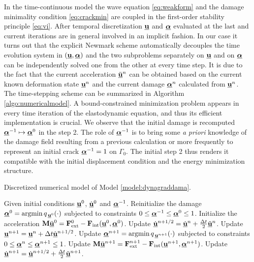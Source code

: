 In the time-continuous model the wave equation \eqref{eq:weakform} and the damage minimality condition \eqref{eq:crackmin} are coupled in the first-order stability principle \eqref{eq:vi}. After temporal discretization $\uvec$ and $\dvec$ evaluated at the last and current iterations are in general involved in an implicit fashion. In our case it turns out that the explicit Newmark scheme automatically decouples the time evolution system in $(\uvec,\dvec)$ and the two subproblems separately on $\uvec$ and on $\dvec$ can be independently solved one from the other at every time step. It is due to the fact that the current acceleration $\ddot{\uvec}^n$ can be obtained based on the current known deformation state $\uvec^n$ and the current damage $\dvec^n$ calculated from $\uvec^n$. The time-stepping scheme can be summarized in Algorithm \ref{algo:numericalmodel}. A bound-constrained minimization problem appears in every time iteration of the elastodynamic equation, and thus its efficient implementation is crucial. We observe that the initial damage is recomputed $\dvec^{-1}\mapsto\dvec^0$ in the step 2. The role of $\dvec^{-1}$ is to bring some \emph{a priori} knowledge of the damage field resulting from a previous calculation or more frequently to represent an initial crack $\dvec^{-1}=1$ on $\Gamma_0$. The initial step 2 thus renders it compatible with the initial displacement condition and the energy minimization structure.
\begin{algorithm*}[htbp]
\caption{Discretized numerical model of Model \ref{model:dynagraddama}.} \label{algo:numericalmodel}
\begin{algorithmic}[1]\linespread{1.2}\selectfont\normalsize
\State Given initial conditions $\uvec^0$, $\dot{\uvec}^0$ and $\dvec^{-1}$.
\State Reinitialize the damage $\dvec^0=\operatorname{arg min}q_{\,\uvec^0}(\cdot)$ subjected to constraints $0\leq\dvec^{-1}\leq\dvec^0\leq 1$.
\State Initialize the acceleration $\vec{M}\ddot{\uvec}^0=\vec{F}_\mathrm{ext}^0-\vec{F}_\mathrm{int}(\uvec^0,\dvec^0)$.
  \State Update $\dot{\uvec}^{n+1/2}=\dot{\uvec}^{n}+\frac{\Delta t}{2}\ddot{\uvec}^n$.
  \State Update $\uvec^{n+1}=\uvec^n+\Delta t\dot{\uvec}^{n+1/2}$.
  \State Update $\dvec^{n+1}=\operatorname{arg min}q_{\,\uvec^{n+1}}(\cdot)$ subjected to constraints $0\leq\dvec^n\leq\dvec^{n+1}\leq 1$.
  \State Update $\vec{M}\ddot{\uvec}^{n+1}=\vec{F}_\mathrm{ext}^{n+1}-\vec{F}_\mathrm{int}(\uvec^{n+1},\dvec^{n+1})$.
  \State Update $\dot{\uvec}^{n+1}=\dot{\uvec}^{n+1/2}+\frac{\Delta t}{2}\ddot{\uvec}^{n+1}$.
\EndFor
\end{algorithmic}
\end{algorithm*}

